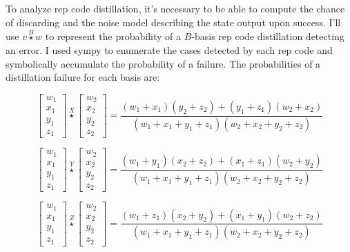 \documentclass[onecolumn,unpublished,a4paper]{quantumarticle}
\theoremstyle{definition}
\theoremstyle{definition}
\theoremstyle{definition}
\begin{document}
To analyze rep code distillation, it's necessary to be able to compute the chance of discarding and the noise model describing the state output upon success.
I'll use $v \stackrel{B}{\star} w$ to represent the probability of a $B$-basis rep code distillation detecting an error.
I used sympy to enumerate the cases detected by each rep code and symbolically accumulate the probability of a failure.
The probabilities of a distillation failure for each basis are:

\begin{equation}
\begin{bmatrix}w_1\\x_1\\y_1\\z_1\end{bmatrix}
\stackrel{X}{\star}
\begin{bmatrix}w_2\\x_2\\y_2\\z_2\end{bmatrix}
= \frac{(w_1 + x_1)(y_2 + z_2) + (y_1 + z_1)(w_2 + x_2)}{(w_1+x_1+y_1+z_1)(w_2+x_2+y_2+z_2)}
\end{equation}


\begin{equation}
\begin{bmatrix}w_1\\x_1\\y_1\\z_1\end{bmatrix}
\stackrel{Y}{\star}
\begin{bmatrix}w_2\\x_2\\y_2\\z_2\end{bmatrix}
= \frac{(w_1 + y_1)(x_2 + z_2) + (x_1 + z_1)(w_2 + y_2)}{(w_1+x_1+y_1+z_1)(w_2+x_2+y_2+z_2)}
\end{equation}


\begin{equation}
\begin{bmatrix}w_1\\x_1\\y_1\\z_1\end{bmatrix}
\stackrel{Z}{\star}
\begin{bmatrix}w_2\\x_2\\y_2\\z_2\end{bmatrix}
= \frac{(w_1 + z_1)(x_2 + y_2) + (x_1 + y_1)(w_2 + z_2)}{(w_1+x_1+y_1+z_1)(w_2+x_2+y_2+z_2)}
\end{equation}
\end{document}
